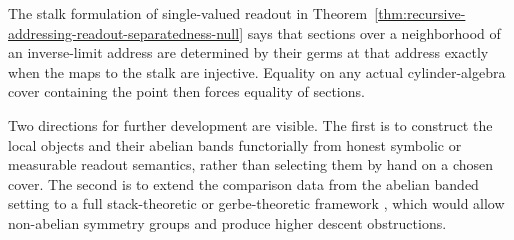 The stalk formulation of single-valued readout in
Theorem~\ref{thm:recursive-addressing-readout-separatedness-null} says that
sections over a neighborhood of an inverse-limit address are determined by
their germs at that address exactly when the maps to the stalk are injective.
Equality on any actual cylinder-algebra cover containing the point then forces equality
of sections.

Two directions for further development are visible.  The first is to construct
the local objects and their abelian bands functorially from honest symbolic or
measurable readout semantics, rather than selecting them by hand on a chosen
cover.  The second is to
extend the comparison data from the abelian banded setting to a full
stack-theoretic or gerbe-theoretic framework
\cite{Giraud1971CohomologieNonAbelienne}, which would allow non-abelian
symmetry groups and produce higher descent obstructions.

